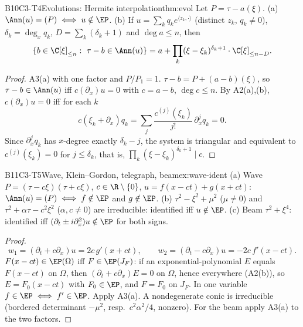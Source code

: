 \begin{dimcard}{B10}{C3-T4}{Evolutions: Hermite interpolation}{\proved}{thm:evol}
Let $P=\tau-a(\xi)$. (a) $\Ann(u)=(P)\iff u\notin\EP$. (b) If $u=\sum_kq_ke^{\langle z_k,\cdot\rangle}$ (distinct $z_k$, $q_k\ne0$), $\delta_k=\deg_xq_k$, $D=\sum_k(\delta_k+1)$ and $\deg a\le n$, then
\[
\{b\in\C[\xi]_{\le n}:\ \tau-b\in\Ann(u)\}=a+\prod_k(\xi-\xi_k)^{\delta_k+1}\cdot\C[\xi]_{\le n-D}.
\]
\end{dimcard}
\begin{proof}
A3(a) with one factor and $P/P_1=1$.
$\tau-b=P+(a-b)(\xi)$, so $\tau-b\in\Ann(u)$ iff $c(\partial_x)u=0$ with $c=a-b$, $\deg c\le n$.
By A2(a),(b), $c(\partial_x)u=0$ iff for each $k$
\[
c(\xi_k+\partial_x)q_k=\sum_j\frac{c^{(j)}(\xi_k)}{j!}\,\partial_x^jq_k=0 .
\]
Since $\partial_x^jq_k$ has $x$-degree exactly $\delta_k-j$, the system is triangular and equivalent to $c^{(j)}(\xi_k)=0$ for $j\le\delta_k$, that is, $\prod_k(\xi-\xi_k)^{\delta_k+1}\mid c$.
\end{proof}

\begin{dimcard}{B11}{C3-T5}{Wave, Klein--Gordon, telegraph, beam}{\proved}{ex:wave-ident}
(a) Wave $P=(\tau-c\xi)(\tau+c\xi)$, $c\in\R\setminus\{0\}$, $u=f(x-ct)+g(x+ct)$: $\Ann(u)=(P)\iff f\notin\EP$ and $g\notin\EP$. (b) $\tau^2-\xi^2+\mu^2$ ($\mu\ne0$) and $\tau^2+\alpha\tau-c^2\xi^2$ ($\alpha,c\ne0$) are irreducible: identified iff $u\notin\EP$. (c) Beam $\tau^2+\xi^4$: identified iff $(\partial_t\pm i\partial_x^2)u\notin\EP$ for both signs.
\end{dimcard}
\begin{proof}
\[
w_1=(\partial_t+c\partial_x)u=2c\,g'(x+ct),\qquad w_2=(\partial_t-c\partial_x)u=-2c\,f'(x-ct).
\]
$F(x-ct)\in\EP(\Omega)$ iff $F\in\EP(J_F)$: if an exponential-polynomial $E$ equals $F(x-ct)$ on $\Omega$, then $(\partial_t+c\partial_x)E=0$ on $\Omega$, hence everywhere (A2(b)), so $E=F_0(x-ct)$ with $F_0\in\EP$, and $F=F_0$ on $J_F$. In one variable $f\in\EP\iff f'\in\EP$. Apply A3(a).
A nondegenerate conic is irreducible (bordered determinant $-\mu^2$, resp.\ $c^2\alpha^2/4$, nonzero). For the beam apply A3(a) to the two factors.
\end{proof}

